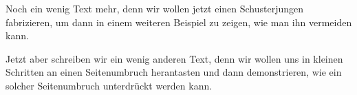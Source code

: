 \documentclass[a5paper]{article}
\begin{document}
\blindtext

\blindtext Noch ein wenig Text mehr, denn wir wollen jetzt einen Schusterjungen fabrizieren, um dann in einem weiteren
Beispiel zu zeigen, wie man ihn vermeiden kann.

Jetzt aber schreiben wir ein wenig anderen Text, denn wir wollen uns in kleinen Schritten an einen
Seitenumbruch herantasten und dann demonstrieren, wie ein solcher Seitenumbruch unterdrückt werden kann.
\end{document}
